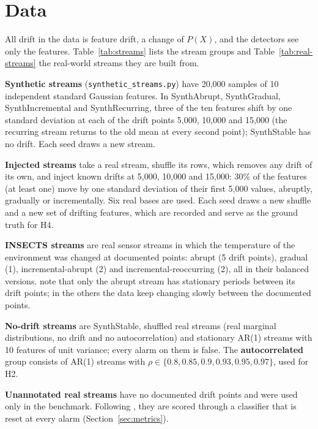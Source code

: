 \section{Data}
\label{sec:datasets}
All drift in the data is feature drift, a change of $P(X)$, and the detectors see only the features. Table~\ref{tab:streams} lists the stream groups and Table~\ref{tab:real-streams} the real-world streams they are built from.

\textbf{Synthetic streams} (\nolinkurl{synthetic_streams.py}) have 20,000 samples of 10 independent standard Gaussian features. In SynthAbrupt, SynthGradual, SynthIncremental and SynthRecurring, three of the ten features shift by one standard deviation at each of the drift points 5,000, 10,000 and 15,000 (the recurring stream returns to the old mean at every second point); SynthStable has no drift. Each seed draws a new stream.

\textbf{Injected streams} take a real stream, shuffle its rows, which removes any drift of its own, and inject known drifts at 5,000, 10,000 and 15,000: 30\% of the features (at least one) move by one standard deviation of their first 5,000 values, abruptly, gradually or incrementally. Six real bases are used. Each seed draws a new shuffle and a new set of drifting features, which are recorded and serve as the ground truth for H4.

\textbf{INSECTS streams} \citep{Souza2020} are real sensor streams in which the temperature of the environment was changed at documented points: abrupt (5 drift points), gradual (1), incremental-abrupt (2) and incremental-reoccurring (2), all in their balanced versions. \citet{Lukats2024} note that only the abrupt stream has stationary periods between its drift points; in the others the data keep changing slowly between the documented points.

\textbf{No-drift streams} are SynthStable, shuffled real streams (real marginal distributions, no drift and no autocorrelation) and stationary AR(1) streams with 10 features of unit variance; every alarm on them is false. The \textbf{autocorrelated} group consists of AR(1) streams with $\rho \in \{0.8, 0.85, 0.9, 0.93, 0.95, 0.97\}$, used for H2.

\textbf{Unannotated real streams} have no documented drift points and were used only in the benchmark. Following \citet{Lukats2024}, they are scored through a classifier that is reset at every alarm (Section~\ref{sec:metrics}).

